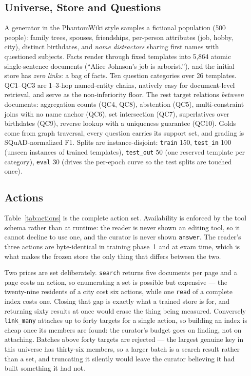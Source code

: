 \documentclass[conference]{IEEEtran}
\begin{document}
\subsection{Universe, Store and Questions}
A generator in the PhantomWiki style samples a fictional population (500
people): family trees, spouses, friendships, per-person attributes (job,
hobby, city), distinct birthdates, and \emph{name distractors} sharing first
names with questioned subjects. Facts render through fixed templates into
5{,}864 atomic single-sentence documents (``Alice Johnson's job is
arborist.''), and the initial store has \emph{zero links}: a bag of facts.
Ten question categories over 26 templates. QC1--QC3 are 1--3-hop
named-entity chains, natively easy for document-level retrieval, and serve
as the non-inferiority floor. The rest target relations \emph{between}
documents: aggregation counts (QC4, QC8), abstention (QC5), multi-constraint
joins with no name anchor (QC6), set intersection (QC7), superlatives over
birthdates (QC9), reverse lookup with a uniqueness guarantee (QC10). Golds
come from graph traversal, every question carries its support set, and
grading is SQuAD-normalized F1. Splits are instance-disjoint:
\texttt{train} 150, \texttt{test\_in} 100 (unseen instances of trained
templates), \texttt{test\_out} 50 (one reserved template per category),
\texttt{eval} 30 (drives the per-epoch curve so the test splits are touched
once).

\subsection{Actions}\label{sec:actions}
Table~\ref{tab:actions} is the complete action set. Availability is enforced
by the tool schema rather than at runtime: the reader is never shown an
editing tool, so it cannot decline to use one, and the curator is never
shown \texttt{answer}. The reader's three actions are byte-identical in
training phase~1 and at exam time, which is what makes the frozen store the
only thing that differs between the two.

Two prices are set deliberately. \texttt{search} returns five documents per
page and a page costs an action, so enumerating a set is possible but
expensive --- the twenty-nine residents of a city cost six actions, while one
\texttt{read} of a complete index costs one. Closing that gap is exactly
what a trained store is for, and returning sixty results at once would erase
the thing being measured. Conversely \texttt{link\_many} attaches up to forty
targets for a single action, so building an index is cheap once its
members are found: the curator's budget goes on finding, not on attaching.
Batches above forty targets are rejected --- the largest genuine key in this
universe has thirty-six members, so a larger batch is a search result rather
than a set, and truncating it silently would leave the curator believing it
had built something it had not.
\end{document}
